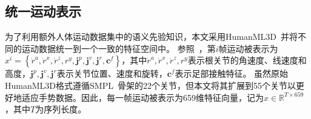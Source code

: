 \subsection{统一运动表示}
\label{sec:method:m_rep:unified}
为了利用额外人体运动数据集中的语义先验知识，本文采用HumanML3D~\cite{guo2022humanml3d}并将不同的运动数据统一到一个一致的特征空间中。
参照~\cite{yang2024freetalker,guo2022humanml3d}，第$i$帧运动被表示为$x^i=\left\{\dot{r}^a, \dot{r}^x, \dot{r}^z, r^y, \mathbf{j}^p, \mathbf{j}^v, \mathbf{j}^r, \mathbf{c}^f\right\}$，其中$\dot{r}^a, \dot{r}^x, \dot{r}^z, r^y$表示根关节的角速度、线速度和高度，$\mathbf{j}^p, \mathbf{j}^v, \mathbf{j}^r$表示关节位置、速度和旋转，$\mathbf{c}^f$表示足部接触特征。
虽然原始HumanML3D格式遵循SMPL~\cite{loper2023smpl}骨架的22个关节，但本文将其扩展到55个关节以更好地适应手势数据。因此，每一帧运动被表示为659维特征向量，记为$x \in \mathbb{R}^{T\times 659}$，其中$T$为序列长度。


